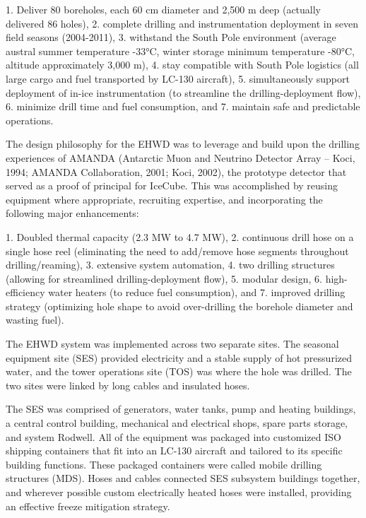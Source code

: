 1.	Deliver 80 boreholes, each 60 cm diameter and 2,500 m deep (actually delivered 86 holes),
2.	complete drilling and instrumentation deployment in seven field seasons (2004-2011),
3.	withstand the South Pole environment (average austral summer temperature -33°C, winter storage minimum temperature -80°C, altitude approximately 3,000 m),
4.	stay compatible with South Pole logistics (all large cargo and fuel transported by LC-130 aircraft),
5.	simultaneously support deployment of in-ice instrumentation (to streamline the drilling-deployment flow),
6.	minimize drill time and fuel consumption, and
7.	maintain safe and predictable operations.

The design philosophy for the EHWD was to leverage and build upon the drilling experiences of AMANDA (Antarctic Muon and Neutrino Detector Array – Koci, 1994; AMANDA Collaboration, 2001; Koci, 2002), the prototype detector that served as a proof of principal for IceCube.  This was accomplished by reusing equipment where appropriate, recruiting expertise, and incorporating the following major enhancements:

1.	Doubled thermal capacity (2.3 MW to 4.7 MW),
2.	continuous drill hose on a single hose reel (eliminating the need to add/remove hose segments throughout drilling/reaming),
3.	extensive system automation,
4.	two drilling structures (allowing for streamlined drilling-deployment flow),
5.	modular design,
6.	high-efficiency water heaters (to reduce fuel consumption), and
7.	improved drilling strategy (optimizing hole shape to avoid over-drilling the borehole diameter and wasting fuel).


The EHWD system was implemented across two separate sites.  The seasonal equipment site (SES) provided electricity and a stable supply of hot pressurized water, and the tower operations site (TOS) was where the hole was drilled.  The two sites were linked by long cables and insulated hoses.

The SES was comprised of generators, water tanks, pump and heating buildings, a central control building, mechanical and electrical shops, spare parts storage, and system Rodwell.  All of the equipment was packaged into customized ISO shipping containers that fit into an LC-130 aircraft and tailored to its specific building functions.  These packaged containers were called mobile drilling structures (MDS).  Hoses and cables connected SES subsystem buildings together, and wherever possible custom electrically heated hoses were installed, providing an effective freeze mitigation strategy.

